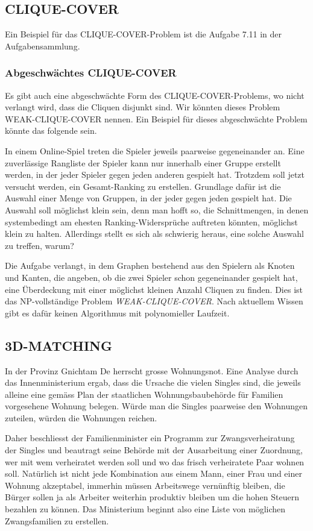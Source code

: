 \subsection{CLIQUE-COVER}
Ein Beispiel für das CLIQUE-COVER-Problem ist die Aufgabe 7.11 in der
Aufgabensammlung.

\subsubsection{Abgeschwächtes CLIQUE-COVER}
Es gibt auch eine abgeschwächte Form des CLIQUE-COVER-Problems, wo
nicht verlangt wird, dass die Cliquen disjunkt sind.
Wir könnten dieses Problem WEAK-CLIQUE-COVER nennen.
Ein Beispiel für dieses abgeschwächte Problem könnte das folgende sein.

\medskip

In einem Online-Spiel treten die Spieler jeweils paarweise gegeneinander an.
Eine zuverlässige Rangliste der Spieler kann nur innerhalb
einer Gruppe erstellt werden, in der jeder Spieler gegen
jeden anderen gespielt hat. Trotzdem soll jetzt versucht werden,
ein Gesamt-Ranking zu erstellen. Grundlage dafür ist die Auswahl
einer Menge von Gruppen, in der jeder gegen jeden gespielt hat.
Die Auswahl soll möglichst klein sein, denn man hofft so, die
Schnittmengen, in denen systembedingt am ehesten Ranking-Widersprüche
auftreten könnten, möglichst klein zu halten. Allerdings stellt es
sich als schwierig heraus, eine solche Auswahl zu treffen, warum?

\medskip

Die Aufgabe verlangt, in dem Graphen bestehend aus den Spielern
als Knoten und Kanten, die angeben, ob die zwei Spieler schon gegeneinander
gespielt hat, eine Überdeckung mit einer möglichst
kleinen Anzahl Cliquen zu finden. Dies ist das NP-vollständige Problem
{\it WEAK-CLIQUE-COVER}. Nach aktuellem Wissen gibt es dafür keinen
Algorithmus mit polynomieller Laufzeit.

\subsection{3D-MATCHING}
In der Provinz Gnichtam De herrscht grosse Wohnungsnot.
Eine Analyse durch das Innenministerium ergab, dass die Ursache
die vielen Singles sind, die jeweils alleine eine gemäss
Plan der staatlichen Wohnungsbaubehörde für Familien vorgesehene
Wohnung belegen.
Würde man die Singles paarweise den Wohnungen zuteilen, würden die
Wohnungen reichen.

Daher beschliesst der Familienminister ein Programm zur Zwangsverheiratung
der Singles und beautragt seine Behörde mit der Ausarbeitung einer Zuordnung,
wer mit wem verheiratet werden soll und wo das frisch verheiratete Paar
wohnen soll.
Natürlich ist nicht jede Kombination aus einem Mann,
einer Frau und einer Wohnung akzeptabel, immerhin müssen 
Arbeitswege vernünftig bleiben, die Bürger sollen ja als 
Arbeiter weiterhin produktiv bleiben um die hohen Steuern bezahlen zu können.
Das Ministerium beginnt also eine Liste von möglichen Zwangsfamilien
zu erstellen.

